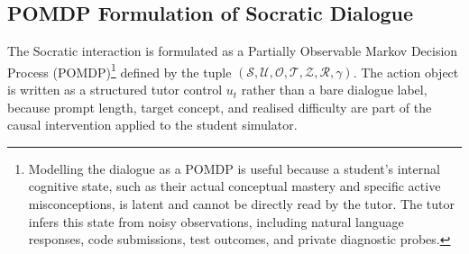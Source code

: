 \documentclass[11pt,a4paper]{report}
\begin{document}
\subsection{POMDP Formulation of Socratic Dialogue}
The Socratic interaction is formulated as a Partially Observable Markov Decision Process (POMDP)\footnote{Modelling the dialogue as a POMDP is useful because a student's internal cognitive state, such as their actual conceptual mastery and specific active misconceptions, is latent and cannot be directly read by the tutor. The tutor infers this state from noisy observations, including natural language responses, code submissions, test outcomes, and private diagnostic probes.} defined by the tuple $(\mathcal{S}, \mathcal{U}, \mathcal{O}, \mathcal{T}, \mathcal{Z}, \mathcal{R}, \gamma)$. The action object is written as a structured tutor control $u_t$ rather than a bare dialogue label, because prompt length, target concept, and realised difficulty are part of the causal intervention applied to the student simulator.
\end{document}
